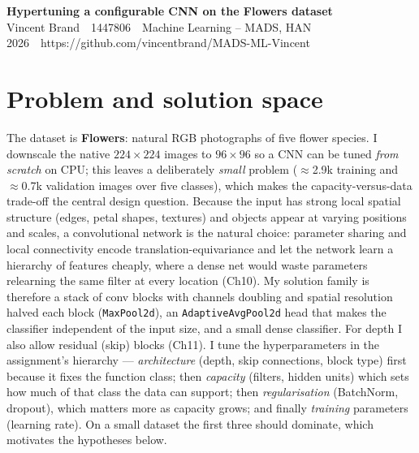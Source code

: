 \documentclass[11pt,a4paper]{article}
\newcommand{\studentname}{Vincent Brand}
\newcommand{\studentnumber}{1447806}
\newcommand{\course}{Machine Learning -- MADS, HAN}
\newcommand{\reportdate}{2026}
\newcommand{\repourl}{https://github.com/vincentbrand/MADS-ML-Vincent}
\begin{document}
\begin{center}
  {\Large\bfseries Hypertuning a configurable CNN on the Flowers dataset}\\[3pt]
  \studentname\ \textbar\ \studentnumber\ \textbar\ \course\\
  \reportdate\ \textbar\ \repourl
\end{center}

\section{Problem and solution space}
The dataset is \textbf{Flowers}: natural RGB photographs of five flower species. I
downscale the native $224\times224$ images to $96\times96$ so a CNN can be tuned
\emph{from scratch} on CPU; this leaves a deliberately \emph{small} problem
($\approx$2.9k training and $\approx$0.7k validation images over five classes), which
makes the capacity-versus-data trade-off the central design question. Because the
input has strong local spatial structure (edges, petal shapes, textures) and objects
appear at varying positions and scales, a convolutional network is the natural choice:
parameter sharing and local connectivity encode translation-equivariance and let the
network learn a hierarchy of features cheaply, where a dense net would waste
parameters relearning the same filter at every location (Ch10). My solution family is
therefore a stack of conv blocks with channels doubling and spatial resolution halved
each block (\texttt{MaxPool2d}), an \texttt{AdaptiveAvgPool2d} head that makes the
classifier independent of the input size, and a small dense classifier. For depth I
also allow residual (skip) blocks (Ch11). I tune the hyperparameters in the
assignment's hierarchy --- \emph{architecture} (depth, skip connections, block type)
first because it fixes the function class; then \emph{capacity} (filters, hidden
units) which sets how much of that class the data can support; then
\emph{regularisation} (BatchNorm, dropout), which matters more as capacity grows; and
finally \emph{training} parameters (learning rate). On a small dataset the first three
should dominate, which motivates the hypotheses below.
\end{document}
